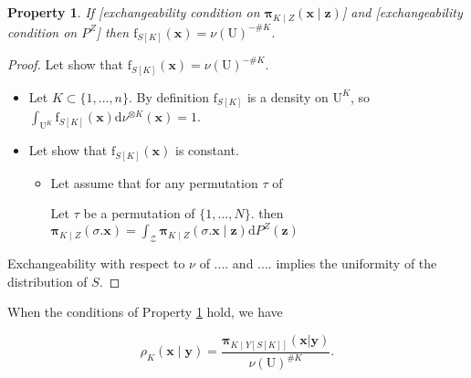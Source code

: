 \documentclass[12pt]{article}
\newtheorem{property}[theorem]{Property}
\theoremstyle{definition}
\theoremstyle{remark}
\newcommand{\dominantU}{\nu}
\newcommand{\sampledensity}{\mathbf{\pi}}
\newcommand{\permutation}{\tau}
\newcommand{\derive}{\mathrm{d}}
\newcommand{\density}{\mathrm{f}}
\newcommand{\Sampleindex}{K}
\newcommand{\Sample}{S}
\newcommand{\Pop}{\mathrm{U}}
\newcommand{\position}{\mathbf{x}}
\newcommand{\Signal}{Y}
\newcommand{\signal}{\mathbf{y}}
\newcommand{\Desvar}{Z}
\newcommand{\DesvarSpace}{\mathscr{Z}}
\newcommand{\desvar}{\mathbf{z}}
\begin{document}
\begin{property}\label{Prop:1}
If 
[exchangeability condition on $\sampledensity_{\Sampleindex\mid \Desvar}(\position\mid \desvar)$] and 
[exchangeability condition on $P^Z$] 
then $\density_{\Sample[\Sampleindex]}(\position)=\dominantU(\Pop)^{-\#\Sampleindex}$.
\end{property}
\begin{proof}
Let show that $\density_{\Sample[\Sampleindex]}(\position)=\dominantU(\Pop)^{-\#\Sampleindex}$.
\begin{itemize}
\item[]
Let $\Sampleindex\subset\{1,\ldots,n\}$.
By definition $\density_{\Sample[\Sampleindex]}$ is a density on $\Pop^\Sampleindex$, so
$\int_{\Pop^\Sampleindex}\density_{\Sample[\Sampleindex]}(\position)\derive\dominantU^{\otimes\Sampleindex}(\position)=1$.
\item[]
Let show that $\density_{\Sample[\Sampleindex]}(\position)$ is constant.
\begin{itemize}
\item[]
Let assume that for any permutation $\permutation$ of

Let $\permutation$ be a permutation of $\{1,\ldots,N\}$. 
then $\sampledensity_{\Sampleindex\mid \Desvar}(\sigma.\position)=\int_{\DesvarSpace}\sampledensity_{\Sampleindex\mid \Desvar}(\sigma.\position\mid\desvar)\derive P^\Desvar(\desvar) $
\end{itemize}
\end{itemize}
Exchangeability with respect to $\dominantU$ of $....$ and $....$  implies the uniformity of the distribution of $\Sample$.
\end{proof}
When the conditions of Property \ref{Prop:1} hold, we have


\begin{equation}
\rho_{\Sampleindex}\left(\position \mid \signal\right)=
    \frac{\sampledensity_{\Sampleindex\mid \Signal[\Sample[\Sampleindex]]}\left(\position|\signal\right)}
    {\dominantU(\Pop)^{\#\Sampleindex}}.
\end{equation}
\end{document}
